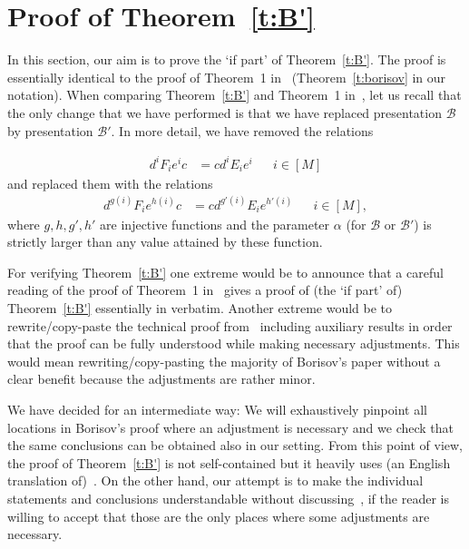 \documentclass[10pt,a4paper]{article}
\theoremstyle{definition}
\theoremstyle{remark}
\newcommand\BB{\mathcal{B}}
\begin{document}



\appendix
\section{Proof of Theorem~\ref{t:B'}}
\label{a:borisov_modified}

In this section, our aim is to prove the `if part' of Theorem~\ref{t:B'}. The proof is
essentially identical to the proof of Theorem~1 in~\cite{borisov69}
(Theorem~\ref{t:borisov} in our notation). When comparing
Theorem~\ref{t:B'} and Theorem~1 in~\cite{borisov69}, let us recall that
the only change that we have performed is that we have replaced presentation
$\BB$ by presentation $\BB'$. In more detail, we have removed the relations 
  
\begin{align*}  
  d^iF_ie^ic &= cd^iE_ie^i & &i \in [M] \tag{B4} 
\end{align*}
and replaced them with the relations
\begin{align}
  d^{g(i)}F_ie^{h(i)}c &= cd^{g'(i)}E_ie^{h'(i)} & &i \in [M] \tag{B4'},
\end{align}
where $g, h, g', h'$ are injective functions and the parameter $\alpha$ (for
$\BB$ or $\BB'$) is strictly larger than any value attained by these function.

For verifying Theorem~\ref{t:B'} one extreme would be to announce that a
careful reading of the proof of Theorem~1 in~\cite{borisov69} gives a proof of
(the `if part' of) Theorem~\ref{t:B'} essentially in verbatim. Another
extreme would be to rewrite/copy-paste the technical proof from~\cite{borisov69}
including auxiliary results in order that the proof can be fully understood
while making necessary adjustments. This would mean rewriting/copy-pasting the
majority of Borisov's paper without a clear benefit because the adjustments are
rather minor. 

We have decided for an intermediate way: We will exhaustively pinpoint all
locations in Borisov's proof where an adjustment is necessary and we check that
the same conclusions can be obtained also in our setting. From this point of
view, the proof of Theorem~\ref{t:B'} is not self-contained but it heavily
uses (an English translation of)~\cite{borisov69}. On the other hand, our
attempt is to make the individual statements and conclusions understandable
without discussing~\cite{borisov69}, if the reader is willing to accept that
those are the only places where some adjustments are necessary.
\end{document}
